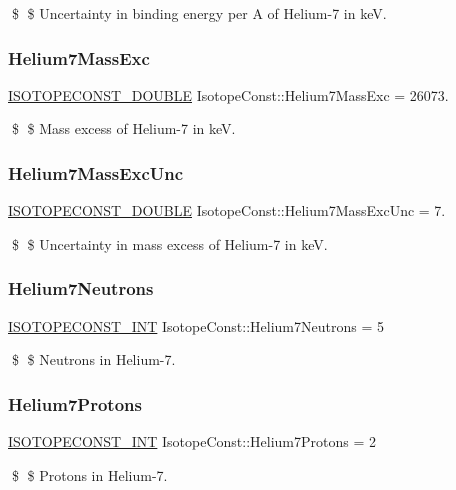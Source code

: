 \$ \$ Uncertainty in binding energy per A of Helium-\/7 in keV. \mbox{\label{group___isotope_const-_helium-_he7_gafe215b54b3ff8c5d568014308974076e}} 
\subsubsection{\texorpdfstring{Helium7\+Mass\+Exc}{Helium7MassExc}}
{\footnotesize\ttfamily \mbox{\hyperlink{group___isotope_const-_macros_ga8f45a7272ce02c0b4c65c44636ed719a}{I\+S\+O\+T\+O\+P\+E\+C\+O\+N\+S\+T\+\_\+\+D\+O\+U\+B\+LE}} Isotope\+Const\+::\+Helium7\+Mass\+Exc = 26073.}

\$ \$ Mass excess of Helium-\/7 in keV. \mbox{\label{group___isotope_const-_helium-_he7_ga49d3e22f46e3f444c6823da238151b26}} 
\subsubsection{\texorpdfstring{Helium7\+Mass\+Exc\+Unc}{Helium7MassExcUnc}}
{\footnotesize\ttfamily \mbox{\hyperlink{group___isotope_const-_macros_ga8f45a7272ce02c0b4c65c44636ed719a}{I\+S\+O\+T\+O\+P\+E\+C\+O\+N\+S\+T\+\_\+\+D\+O\+U\+B\+LE}} Isotope\+Const\+::\+Helium7\+Mass\+Exc\+Unc = 7.}

\$ \$ Uncertainty in mass excess of Helium-\/7 in keV. \mbox{\label{group___isotope_const-_helium-_he7_ga7a3556a156678ef4f1524d81ce4ea847}} 
\subsubsection{\texorpdfstring{Helium7\+Neutrons}{Helium7Neutrons}}
{\footnotesize\ttfamily \mbox{\hyperlink{group___isotope_const-_macros_ga5f18360b3e99483a35c32d789e62621c}{I\+S\+O\+T\+O\+P\+E\+C\+O\+N\+S\+T\+\_\+\+I\+NT}} Isotope\+Const\+::\+Helium7\+Neutrons = 5}

\$ \$ Neutrons in Helium-\/7. \mbox{\label{group___isotope_const-_helium-_he7_gaa3fd60bcd0606cab22354e98d26d4f34}} 
\subsubsection{\texorpdfstring{Helium7\+Protons}{Helium7Protons}}
{\footnotesize\ttfamily \mbox{\hyperlink{group___isotope_const-_macros_ga5f18360b3e99483a35c32d789e62621c}{I\+S\+O\+T\+O\+P\+E\+C\+O\+N\+S\+T\+\_\+\+I\+NT}} Isotope\+Const\+::\+Helium7\+Protons = 2}

\$ \$ Protons in Helium-\/7. 